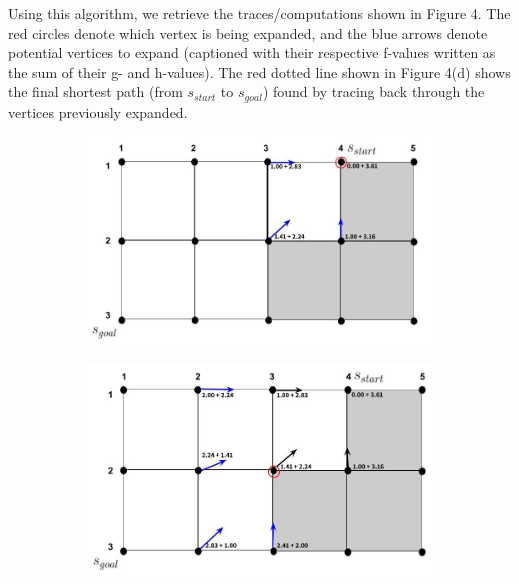 \documentclass[12pt]{article}
\begin{document}
\begin{enumerate}[label=(\alph*)]
\begin{enumerate}
      Using this algorithm, we retrieve the traces/computations shown in Figure 4. The red circles denote which vertex is being expanded, and the blue arrows denote potential vertices to expand (captioned with their respective f-values written as the sum of their g- and h-values). The red dotted line shown in Figure 4(d) shows the final shortest path (from $s_{start}$ to $s_{goal}$) found by tracing back through the vertices previously expanded.
      \begin{figure}
          \begin{subfigure}{0.5\textwidth}
            \centering
            \includegraphics[width=\textwidth]{homework1/images/drawndiagrams/prob1bii/figure3a.jpg}
            \caption{}
            \label{fig:fig3a}
          \end{subfigure}
          \begin{subfigure}{0.5\textwidth}
            \centering
            \includegraphics[width=\textwidth]{homework1/images/drawndiagrams/prob1bii/figure3b.jpg}
            \caption{}

\end{subfigure}
\end{figure}
\end{enumerate}
\end{enumerate}
\end{document}
